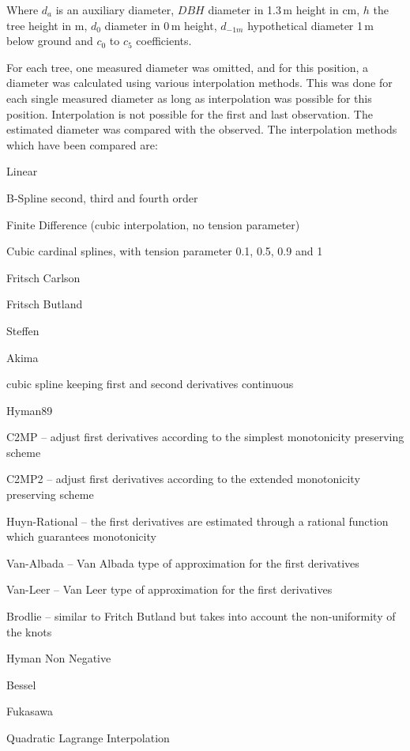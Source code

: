 \documentclass[twocolumn]{scrartcl}
\begin{document}
Where $d_{a}$ is an auxiliary diameter, $DBH$ diameter in 1.3\,m height in cm,
$h$ the tree height in m, $d_0$ diameter in 0\,m height, $d_{-1m}$ hypothetical
diameter 1\,m below ground and $c_0$ to $c_5$ coefficients.

For each tree, one measured diameter was omitted, and for this position, a
diameter was calculated using various interpolation methods. This was done for
each single measured diameter as long as interpolation was possible for this
position. Interpolation is not possible for the first and last observation. The
estimated diameter was compared with the observed. The interpolation methods
which have been compared are: %

\begin{description}[nolistsep]
  \item[A] Linear
  \item[B] B-Spline second, third and fourth order
  \item[C] Finite Difference (cubic interpolation, no tension parameter)
  \item[D] Cubic cardinal splines, with tension parameter 0.1, 0.5, 0.9 and 1
  \item[E] Fritsch Carlson \citep{fritschCarlson1980interpolation}
  \item[F] Fritsch Butland \citep{fritschButland1984interpolation}
  \item[G] Steffen \citep{steffen1990interpolation}
  \item[H] Akima \citep{akima1970interpolation}
  \item[I] cubic spline keeping first and second derivatives continuous
  \item[J] Hyman89 \citep{Dougherty1989interpolation}
  \item[K] C2MP -- adjust first derivatives according to the simplest monotonicity preserving scheme \citep{huynh1993interpolation}
  \item[L] C2MP2 -- adjust first derivatives according to the extended monotonicity preserving scheme \citep{huynh1993interpolation}
  \item[M] Huyn-Rational -- the first derivatives are estimated through a rational function which guarantees monotonicity \citep{huynh1993interpolation}
  \item[N] Van-Albada -- Van Albada type of approximation for the first derivatives \citep{huynh1993interpolation}
  \item[O] Van-Leer -- Van Leer type of approximation for the first derivatives \citep{huynh1993interpolation}
  \item[P] Brodlie -- similar to Fritch Butland but takes into account the non-uniformity of the knots
  \item[Q] Hyman Non Negative
  \item[R] Bessel
  \item[S] Fukasawa
  \item[T] Quadratic Lagrange Interpolation
\end{description}
\end{document}

